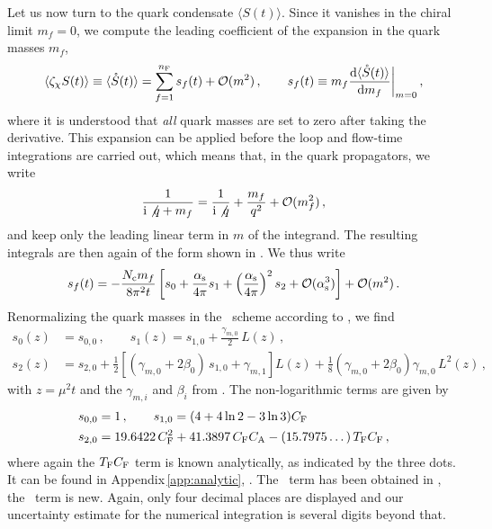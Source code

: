 Let us now turn to the quark condensate $\langle S(t)\rangle$. Since it
vanishes in the chiral limit $m_f=0$, we compute the leading coefficient
of the expansion in the quark masses $m_f$,
\begin{align}
  \left\langle \zeta_\chi S(t) \right\rangle \equiv \langle
  \mathring{S}(t) \rangle = \sum_{f=1}^{\NF} s_f(t) + \mathcal{O}(m^2)\,,\qquad
  s_f(t) \equiv m_f\dderiv{\langle
    \mathring{S}(t)\rangle}{m_f}\bigg|_{m=0}\,,
  \label{eq:sring}
\end{align}
where it is understood that \textit{all} quark masses are set to zero
after taking the derivative.  This expansion can be applied before the
loop and flow-time integrations are carried out, which means that, in
the quark propagators, we write
\begin{equation}
  \begin{split}
    \frac{1}{\mathrm{i}\slashed{q}+m_f} =
    \frac{1}{\mathrm{i}\slashed{q}} + \frac{m_f}{q^2} +
    \mathcal{O}(m_f^2)\,,
    \label{eq:massexp}
  \end{split}
\end{equation}
and keep only the leading linear term in $m$ of the integrand. The resulting
integrals are then again of the form shown in . We thus
write
\begin{equation}
  s_f(t) = - \frac{\NC m_f}{8\pi^2t} \left[s_0 + \frac{\alphas}{4\pi} s_1 +
    \left(\frac{\alphas}{4\pi}\right)^2 s_2 +
    \mathcal{O}(\alphas^3)\right] + \mathcal{O}(m^2) \,.
\end{equation}
Renormalizing the quark masses in the \msbar\ scheme according to
, we find
\begin{equation}
  \begin{split}
    s_0(z) &= s_{0,0}\,,\qquad
    s_1(z) = s_{1,0} + \frac{\gamma_{m,0}}{2}\,L(z)\,,\\
    s_2(z) &= s_{2,0} + \frac{1}{2}\left[(\gamma_{m,0}+2\beta_0)\,s_{1,0} +
      \gamma_{m,1}\right]L(z) +
    \frac{1}{8}(\gamma_{m,0}+2\beta_0)\gamma_{m,0}\,L^2(z)\,,
    \label{eq:sfull}
  \end{split}
\end{equation}
with $z=\mu^2t$ and the $\gamma_{m,i}$ and $\beta_i$ from .
The non-logarithmic terms are given by
\begin{equation}
  \begin{split}
    s_{0,0} &= 1\,,\qquad s_{1,0} = (4 + 4 \ln 2 - 3 \ln 3) \CF \\
    s_{2,0} &= 19.6422\, \CF^2 + 41.3897\, \CF \CA - (15.7975\dots)\, \TF \CF\,,
    \label{eq:sconst}
  \end{split}
\end{equation}
where again the $\TF\CF$ term is known analytically, as indicated by the
three dots. It can be found in Appendix\,\ref{app:analytic},
.  The \nlo\ term has been obtained in
, the \nnlo\ term is new. Again, only four decimal
places are displayed and our uncertainty estimate for the numerical
integration is several digits beyond that.

